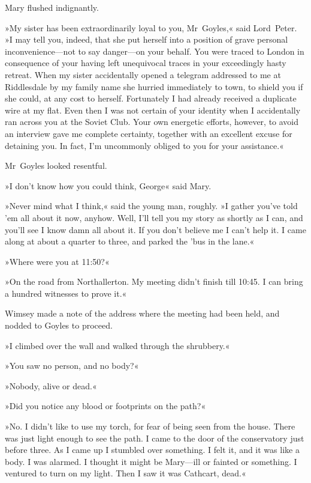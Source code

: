 Mary flushed indignantly.

»My sister has been extraordinarily loyal to you, Mr~Goyles,« said Lord~Peter. »I may tell you, indeed, that she put herself into a position of grave personal inconvenience—not to say danger—on your behalf. You were traced to London in consequence of your having left unequivocal traces in your exceedingly hasty retreat. When my sister accidentally opened a telegram addressed to me at Riddlesdale by my family name she hurried immediately to town, to shield you if she could, at any cost to herself. Fortunately I had already received a duplicate wire at my flat. Even then I was not certain of your identity when I accidentally ran across you at the Soviet Club. Your own energetic efforts, however, to avoid an interview gave me complete certainty, together with an excellent excuse for detaining you. In fact, I'm uncommonly obliged to you for your assistance.«

Mr~Goyles looked resentful.

»I don't know how you could think, George\longdash« said Mary.

»Never mind what I think,« said the young man, roughly. »I gather you've told 'em all about it now, anyhow. Well, I'll tell you my story as shortly as I can, and you'll see I know damn all about it. If you don't believe me I can't help it. I came along at about a quarter to three, and parked the 'bus in the lane.«

»Where were you at 11:50?«

»On the road from Northallerton. My meeting didn't finish till 10:45. I can bring a hundred witnesses to prove it.«

Wimsey made a note of the address where the meeting had been held, and nodded to Goyles to proceed.

»I climbed over the wall and walked through the shrubbery.«

»You saw no person, and no body?«

»Nobody, alive or dead.«

»Did you notice any blood or footprints on the path?«

»No. I didn't like to use my torch, for fear of being seen from the house. There was just light enough to see the path. I came to the door of the conservatory just before three. As I came up I stumbled over something. I felt it, and it was like a body. I was alarmed. I thought it might be Mary—ill or fainted or something. I ventured to turn on my light. Then I saw it was Cathcart, dead.«

